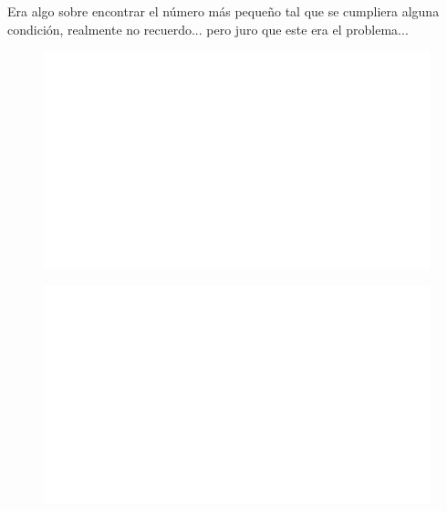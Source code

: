 Era algo sobre encontrar el número más pequeño tal que se cumpliera alguna condición, realmente no recuerdo... pero juro que este era el problema...

\begin{centering}
    \begin{figure}[h]
        \centering
        \includegraphics[width=\textwidth]{whyareyoucheckingthenameofthisfile.png}
    \end{figure}
\end{centering}

\begin{centering}
    \begin{figure}[h!]
        \centering
        \includegraphics[width=\textwidth]{whyareyoucheckingthenameofthisfile.png}
    \end{figure}
\end{centering}

